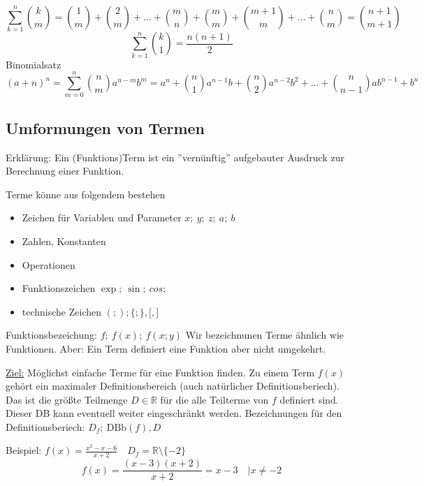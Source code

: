 \documentclass[12pt,a4paper]{article}
\begin{document}
$$\sum\limits_{k=1}^n \binom{k}{m} = \binom{1}{m}+\binom{2}{m}+ \dots + \binom{m}{n}+\binom{m}{m}+\binom{m+1}{m}+\dots+\binom{n}{m}=\binom{n+1}{m+1}$$
$$\sum\limits_{k=1}^n\binom{k}{1} = \frac{n(n+1)}{2}$$
Binomialsatz
$$(a+n)^n=\sum\limits_{m=0}^n\binom{n}{m}a^{n-m}b^m=a^n+\binom{n}{1}a^{n-1}b+\binom{n}{2}a^{n-2}b^2+\dots + \binom{n}{n-1}ab^{n-1}+b^n$$
\subsection{Umformungen von Termen}
Erklärung: Ein (Funktions)Term ist ein ''vernünftig'' aufgebauter Ausdruck zur Berechnung einer Funktion.

Terme könne aus folgendem bestehen
\begin{itemize}
	\item Zeichen für Variablen und Parameter $x;\ y;\ z;\ a;\ b$
	\item Zahlen, Konstanten
	\item Operationen
	\item Funktionszeichen $\exp;\ \sin;\ cos;\ $
	\item technische Zeichen $(;);\lbrace;\rbrace,\lbrack,\rbrack$
\end{itemize}
Funktionsbezeichung: $f;\ f(x);\ f(x;y)$ Wir bezeichnunen Terme ähnlich wie Funktionen. Aber: Ein Term definiert eine Funktion aber nicht umgekehrt.


\underline{Ziel:} Möglichst einfache Terme für eine Funktion finden. Zu einem Term $f(x)$ gehört ein maximaler Definitionsbereich (auch natürlicher Definitionsberiech). Das ist die größte Teilmenge $D \in \mathbb{R}$ für die alle Teilterme von $f$ definiert sind. Dieser DB kann eventuell weiter eingeschränkt werden. Bezeichnungen für den Definitionsberiech: $D_f;\ \textrm{DBb}(f), D$


Beispiel: $f(x) = \frac{x^2-x-6}{x+2}\quad D_f=\mathbb{R}\setminus\lbrace-2\rbrace$
$$f(x)= \frac{(x-3)(x+2)}{x+2} = x-3\quad | x \not = -2$$
\end{document}
